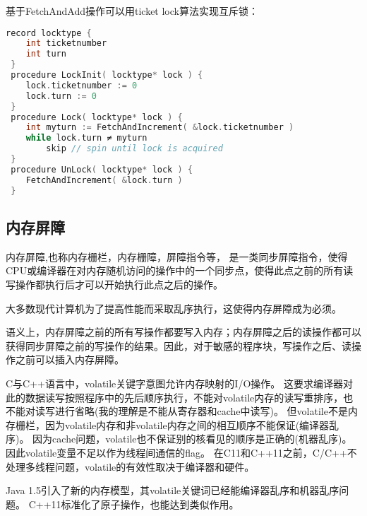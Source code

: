 基于FetchAndAdd操作可以用ticket lock算法实现互斥锁：
\begin{lstlisting}[language=C++]
record locktype {
    int ticketnumber
    int turn
 }
 procedure LockInit( locktype* lock ) {
    lock.ticketnumber := 0
    lock.turn := 0
 }
 procedure Lock( locktype* lock ) {
    int myturn := FetchAndIncrement( &lock.ticketnumber )
    while lock.turn ≠ myturn 
        skip // spin until lock is acquired
 }
 procedure UnLock( locktype* lock ) {
    FetchAndIncrement( &lock.turn )
 }
\end{lstlisting}


\subsection{内存屏障}
\label{subsec:MemBarrier}
内存屏障,也称内存栅栏，内存栅障，屏障指令等， 是一类同步屏障指令，使得CPU或编译器在对内存随机访问的操作中的一个同步点，使得此点之前的所有读写操作都执行后才可以开始执行此点之后的操作。

大多数现代计算机为了提高性能而采取乱序执行，这使得内存屏障成为必须。

语义上，内存屏障之前的所有写操作都要写入内存；内存屏障之后的读操作都可以获得同步屏障之前的写操作的结果。因此，对于敏感的程序块，写操作之后、读操作之前可以插入内存屏障。

C与C++语言中，volatile关键字意图允许内存映射的I/O操作。
这要求编译器对此的数据读写按照程序中的先后顺序执行，不能对volatile内存的读写重排序，也不能对读写进行省略(我的理解是不能从寄存器和cache中读写)。
但volatile不是内存栅栏，因为volatile内存和非volatile内存之间的相互顺序不能保证(编译器乱序)。
因为cache问题，volatile也不保证别的核看见的顺序是正确的(机器乱序)。
因此volatile变量不足以作为线程间通信的flag。
在C11和C++11之前，C/C++不处理多线程问题，volatile的有效性取决于编译器和硬件。

Java 1.5引入了新的内存模型，其volatile关键词已经能编译器乱序和机器乱序问题。
C++11标准化了原子操作，也能达到类似作用。


